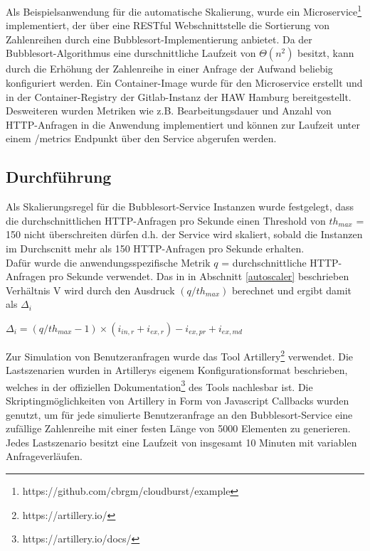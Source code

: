 \documentclass[runningheads]{llncs}
\begin{document}
Als Beispielsanwendung für die automatische Skalierung, wurde ein Microservice\footnote{https://github.com/cbrgm/cloudburst/example} implementiert, der über eine RESTful Webschnittstelle die Sortierung von Zahlenreihen durch eine Bubblesort-Implementierung anbietet. Da der Bubblesort-Algorithmus eine durschnittliche Laufzeit von $\Theta \left( n^{2}\right)$ besitzt, kann durch die Erhöhung der Zahlenreihe in einer Anfrage der Aufwand beliebig konfiguriert werden. Ein Container-Image wurde für den Microservice erstellt und in der Container-Registry der Gitlab-Instanz der HAW Hamburg bereitgestellt. \\

Desweiteren wurden Metriken wie z.B. Bearbeitungsdauer und Anzahl von HTTP-Anfragen in die Anwendung implementiert und können zur Laufzeit unter einem /metrics Endpunkt über den Service abgerufen werden.

\subsection{Durchführung}

Als Skalierungsregel für die Bubblesort-Service Instanzen wurde festgelegt, dass die durchschnittlichen HTTP-Anfragen pro Sekunde einen Threshold von $th_{max}$ = 150 nicht überschreiten dürfen d.h. der Service  wird skaliert, sobald die Instanzen im Durchscnitt mehr als 150 HTTP-Anfragen pro Sekunde erhalten. \\

Dafür wurde die anwendungsspezifische Metrik $q$ = durchschnittliche HTTP-Anfragen pro Sekunde verwendet.
Das in in Abschnitt \ref{autoscaler} beschrieben Verhältnis V wird durch den Ausdruck $(q/th_{max})$ berechnet und ergibt damit als $\Delta_{i}$

\begin{center}
	$\Delta_{i} = (q/th_{max}-1) \times (i_{in,r} + i_{ex,r}) - i_{ex,pr} + i_{ex,md}$
\end{center}

Zur Simulation von Benutzeranfragen wurde das Tool Artillery\footnote{https://artillery.io/} verwendet. Die Lastszenarien wurden in Artillerys eigenem Konfigurationsformat beschrieben, welches  in der offiziellen Dokumentation\footnote{https://artillery.io/docs/} des Tools nachlesbar ist. Die Skriptingmöglichkeiten von Artillery in Form von Javascript Callbacks  wurden genutzt, um für jede simulierte Benutzeranfrage an den Bubblesort-Service eine zufällige Zahlenreihe mit einer festen Länge von 5000 Elementen zu generieren. Jedes Lastszenario besitzt eine Laufzeit von insgesamt 10 Minuten mit variablen Anfrageverläufen.\\
\end{document}
